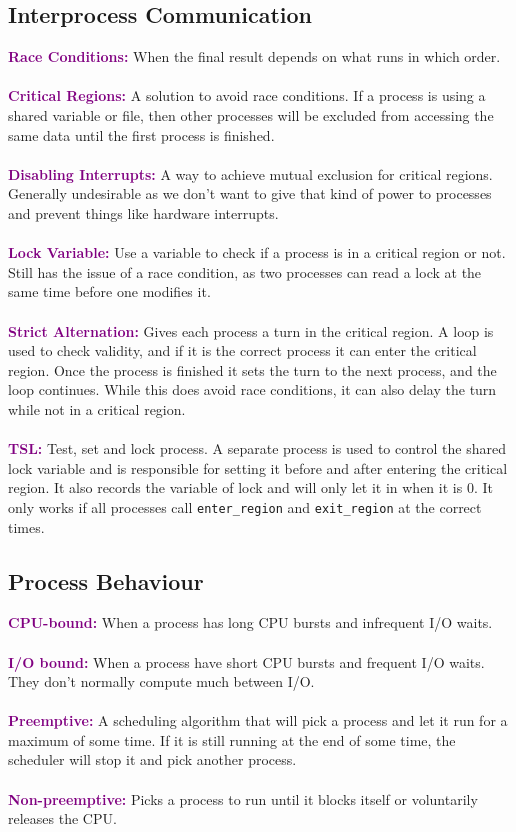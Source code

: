 \documentclass[a4paper,10pt]{article}
\begin{document}
\subsection{Interprocess Communication}
\textcolor{Purple}{\textbf{Race Conditions:}} When the final result depends on what runs in which order. \\\\
\textcolor{Purple}{\textbf{Critical Regions:}} A solution to avoid race conditions. If a process is using a shared variable or file, then other processes will be excluded from accessing the same data until the first process is finished. \\\\
\textcolor{Purple}{\textbf{Disabling Interrupts:}} A way to achieve mutual exclusion for critical regions. Generally undesirable as we don't want to give that kind of power to processes and prevent things like hardware interrupts. \\\\
\textcolor{Purple}{\textbf{Lock Variable:}} Use a variable to check if a process is in a critical region or not. Still has the issue of a race condition, as two processes can read a lock at the same time before one modifies it. \\\\
\textcolor{Purple}{\textbf{Strict Alternation:}} Gives each process a turn in the critical region. A loop is used to check validity, and if it is the correct process it can enter the critical region. Once the process is finished it sets the turn to the next process, and the loop continues. While this does avoid race conditions, it can also delay the turn while not in a critical region. \\\\
\textcolor{Purple}{\textbf{TSL:}} Test, set and lock process. A separate process is used to control the shared lock variable and is responsible for setting it before and after entering the critical region. It also records the variable of lock and will only let it in when it is 0. It only works if all processes call \texttt{enter\_region} and \texttt{exit\_region} at the correct times. 
\subsection{Process Behaviour}
\textcolor{Purple}{\textbf{CPU-bound:}} When a process has long CPU bursts and infrequent I/O waits. \\\\
\textcolor{Purple}{\textbf{I/O bound:}} When a process have short CPU bursts and frequent I/O waits. They don't normally compute much between I/O. \\\\
\textcolor{Purple}{\textbf{Preemptive:}} A scheduling algorithm that will pick a process and let it run for a maximum of some time. If it is still running at the end of some time, the scheduler will stop it and pick another process. \\\\
\textcolor{Purple}{\textbf{Non-preemptive:}} Picks a process to run until it blocks itself or voluntarily releases the CPU. \\\\
\end{document}

